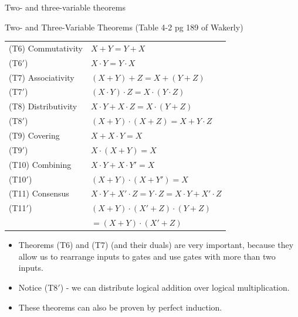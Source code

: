 \begin{frame}{Two- and three-variable theorems}
  \begin{block}{Two- and Three-Variable Theorems (Table 4-2 pg 189 of Wakerly)}
    \begin{center}
      \begin{tabular}{ll}
        (T6) Commutativity & $X + Y = Y + X$ \\
        (T6$'$) & $X \cdot Y = Y \cdot X$ \\
        (T7) Associativity & $(X + Y) + Z = X + (Y + Z)$ \\
        (T7$'$) & $(X \cdot Y) \cdot Z = X \cdot (Y \cdot Z)$ \\
        (T8) Distributivity& $X \cdot Y + X \cdot Z = X \cdot (Y + Z)$ \\
        (T8$'$) & $(X + Y) \cdot (X + Z) = X + Y \cdot Z$ \\
        (T9) Covering & $X + X \cdot Y = X$ \\
        (T9$'$) & $X \cdot (X + Y) = X$ \\
        (T10) Combining & $X \cdot Y + X \cdot Y' = X$ \\
        (T10$'$) & $(X + Y) \cdot (X + Y')=X$ \\
        (T11) Consensus & $X \cdot Y + X' \cdot Z = Y \cdot Z = X \cdot Y + X' \cdot Z$ \\
        (T11$'$) & $(X + Y) \cdot (X' + Z) \cdot (Y+Z)$ \\
                 & $ = (X + Y) \cdot (X' + Z)$ \\
      \end{tabular}
    \end{center}
  \end{block}
\end{frame}

\begin{itemize}
  \item Theorems (T6) and (T7) (and their duals) are very important, because they allow us to rearrange inputs to gates and use gates with more than two inputs.
  \item Notice (T8$'$) - we can distribute logical addition over logical multiplication.
  \item These theorems can also be proven by perfect induction.
\end{itemize}

